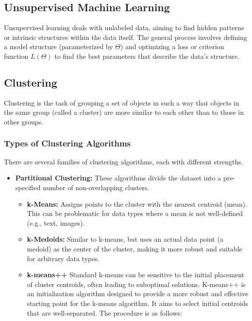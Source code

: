 \documentclass{article}
\begin{document}
\begin{multicols}{2}
	\section{Unsupervised Machine Learning}
	Unsupervised learning deals with unlabeled data, aiming to find hidden patterns or intrinsic structures within the data itself. The general process involves defining a model structure (parameterized by $\Theta$) and optimizing a loss or criterion function $L(\Theta)$ to find the best parameters that describe the data's structure.

	\subsection{Clustering}
	Clustering is the task of grouping a set of objects in such a way that objects in the same group (called a cluster) are more similar to each other than to those in other groups.

	\subsubsection{Types of Clustering Algorithms}
	There are several families of clustering algorithms, each with different strengths.
	\begin{itemize}
		\item \textbf{Partitional Clustering:} These algorithms divide the dataset into a pre-specified number of non-overlapping clusters.
		      \begin{itemize}
			      \item \textbf{k-Means:} Assigns points to the cluster with the nearest centroid (mean). This can be problematic for data types where a mean is not well-defined (e.g., text, images).
			      \item \textbf{k-Medoids:} Similar to k-means, but uses an actual data point (a medoid) as the center of the cluster, making it more robust and suitable for arbitrary data types.

			      \item \textbf{k-means++}
			            Standard k-means can be sensitive to the initial placement of cluster centroids, often leading to suboptimal solutions. K-means++ is an initialization algorithm designed to provide a more robust and effective starting point for the k-means algorithm. It aims to select initial centroids that are well-separated. The procedure is as follows:


\end{itemize}
\end{itemize}
\end{multicols}
\end{document}
